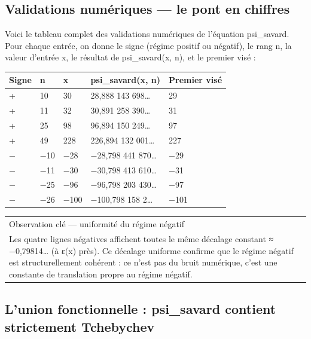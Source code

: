 \documentclass[11pt,a4paper]{article}
\newcommand{\ColorTableHeader}{\rowcolor{TableHeader}}
\begin{document}
\subsection{Validations numériques — le pont en chiffres}

Voici le tableau complet des validations numériques de l'équation psi\_savard. Pour chaque entrée, on donne le signe (régime positif ou négatif), le rang n, la valeur d'entrée x, le résultat de psi\_savard(x, n), et le premier visé :

\begin{exampleblock}[title={Validations numériques du pont Savard}]


\begin{longtable}{|p{}|p{}|p{}|p{}|p{}|}
\hline
\ColorTableHeader
Signe & n & x & psi\_savard(x, n) & Premier visé \\
\hline
+ & 10 & 30 & 28,888 143 698… & 29 \\
\hline
+ & 11 & 32 & 30,891 258 390… & 31 \\
\hline
+ & 25 & 98 & 96,894 150 249… & 97 \\
\hline
+ & 49 & 228 & 226,894 132 001… & 227 \\
\hline
− & −10 & −28 & −28,798 441 870… & −29 \\
\hline
− & −11 & −30 & −30,798 413 610… & −31 \\
\hline
− & −25 & −96 & −96,798 203 430… & −97 \\
\hline
− & −26 & −100 & −100,798 158 2… & −101 \\
\hline
\end{longtable}



\begin{longtable}{|p{}|}
\hline
Observation clé — uniformité du régime négatif \\ Les quatre lignes négatives affichent toutes le même décalage constant ≈ −0,79814… (à ε(x) près). Ce décalage uniforme confirme que le régime négatif est structurellement cohérent : ce n'est pas du bruit numérique, c'est une constante de translation propre au régime négatif. \\
\hline
\end{longtable}

\end{exampleblock}


\subsection{L'union fonctionnelle : psi\_savard contient strictement Tchebychev}
\end{document}
